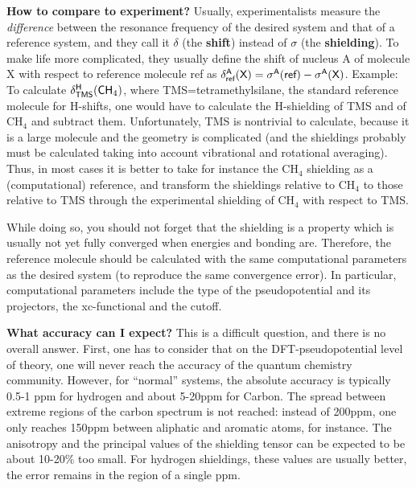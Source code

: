 \documentclass[twoside,10pt,titlepage,a4paper]{article}
\begin{document}
\textbf{How to compare to experiment?}
Usually, experimentalists measure the {\textit{difference}} between
the resonance frequency of the desired system and that of a reference
system, and they call it $\delta$ (the {\bfseries shift}) instead of
$\sigma$ (the {\bfseries shielding}). To make life more complicated,
they usually define the shift of nucleus {\sffamily A} of molecule
{\sffamily X} with respect to reference molecule {\sffamily ref} as
%
$\delta^{\text{\sffamily A}}_{\text{\sffamily ref}}({\text{\sffamily X}}) =
 \sigma^{\text{\sffamily A}}({\text{\sffamily ref}})-
 \sigma^{\text{\sffamily A}}({\text{\sffamily X}})$.
%
Example: To calculate
%
$\delta^{\text{\sffamily H}}_{\text{\sffamily TMS}}({\text{\sffamily
CH}}_4)$,
%
where TMS=tetramethylsilane, the standard reference molecule for
H-shifts, one would have to calculate the H-shielding of TMS and of
CH$_4$ and subtract them. Unfortunately, TMS is nontrivial to
calculate, because it is a large molecule and the geometry is
complicated (and the shieldings probably must be calculated taking
into account vibrational and rotational averaging). Thus, in most
cases it is better to take for instance the CH$_4$ shielding as a
(computational) reference, and transform the shieldings relative to
CH$_4$ to those relative to TMS through the experimental shielding of
CH$_4$ with respect to TMS.

While doing so, you should not forget that the shielding is a property
which is usually not yet fully converged when energies and bonding
are. Therefore, the reference molecule should be calculated with the
same computational parameters as the desired system (to reproduce the
same convergence error). In particular, computational parameters
include the type of the pseudopotential and its projectors, the
xc-functional and the cutoff.



\textbf{What accuracy can I expect?}
This is a difficult question, and there is no overall answer. First,
one has to consider that on the DFT-pseudopotential level of theory,
one will never reach the accuracy of the quantum chemistry community.
                However, for ``normal'' systems, the absolute accuracy is typically
0.5-1 ppm for hydrogen and about 5-20ppm for Carbon. The spread
between extreme regions of the carbon spectrum is not reached: instead
of 200ppm, one only reaches 150ppm between aliphatic and aromatic
atoms, for instance. The anisotropy and the principal values of the
shielding tensor can be expected to be about 10-20\% too small.  For
hydrogen shieldings, these values are usually better, the error
remains in the region of a single ppm.
\end{document}

